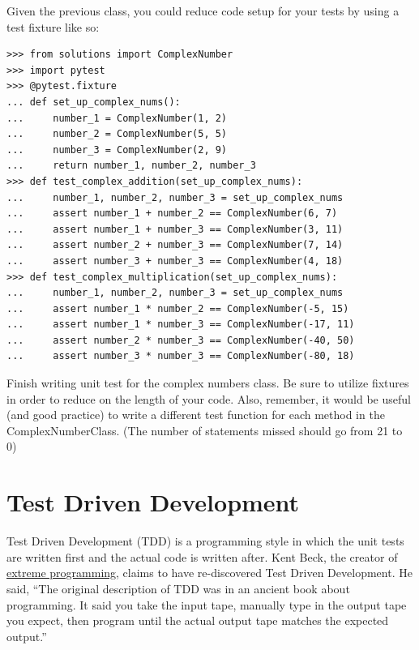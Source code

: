 Given the previous class, you could reduce code setup for your tests by using a test fixture like so:

\begin{lstlisting}
>>> from solutions import ComplexNumber
>>> import pytest
>>> @pytest.fixture
... def set_up_complex_nums():
...     number_1 = ComplexNumber(1, 2)
...     number_2 = ComplexNumber(5, 5)
...     number_3 = ComplexNumber(2, 9)
...     return number_1, number_2, number_3
>>> def test_complex_addition(set_up_complex_nums):
...     number_1, number_2, number_3 = set_up_complex_nums
...     assert number_1 + number_2 == ComplexNumber(6, 7)
...     assert number_1 + number_3 == ComplexNumber(3, 11)
...     assert number_2 + number_3 == ComplexNumber(7, 14)
...     assert number_3 + number_3 == ComplexNumber(4, 18)
>>> def test_complex_multiplication(set_up_complex_nums):
...     number_1, number_2, number_3 = set_up_complex_nums
...     assert number_1 * number_2 == ComplexNumber(-5, 15)
...     assert number_1 * number_3 == ComplexNumber(-17, 11)
...     assert number_2 * number_3 == ComplexNumber(-40, 50)
...     assert number_3 * number_3 == ComplexNumber(-80, 18)
\end{lstlisting}

\begin{problem} %
Finish writing unit test for the complex numbers class. Be sure to utilize fixtures in order to reduce on the length of your code.
Also, remember, it would be useful (and good practice) to write a different test function for each method in the ComplexNumberClass.
(The number of statements missed should go from 21 to 0)
\end{problem}

\section*{Test Driven Development} %

Test Driven Development (TDD) is a programming style in which the unit tests are written first and the actual code is written after.
Kent Beck, the creator of \href{https://en.wikipedia.org/wiki/Extreme_programming}{extreme programming}, claims to have re-discovered  Test Driven Development. He said,
``The original description of TDD was in an ancient book about programming. It said you take the input tape, manually type in the output tape you expect, then program until the actual output tape matches the expected output.''

